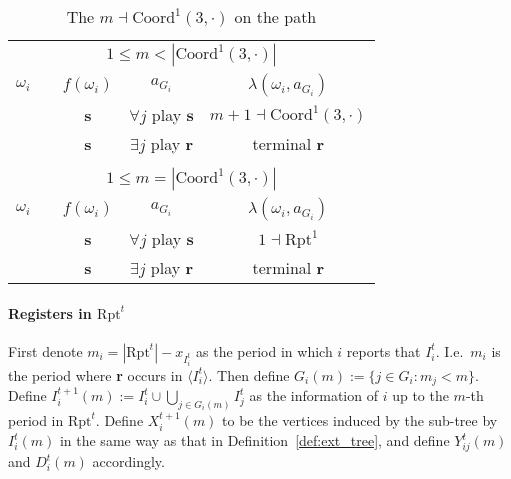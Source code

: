 \documentclass[12pt,letter]{article}
\newcommand{\Kappa}{\mathrm{Coord}}
\newcommand{\Omicron}{\mathrm{Rpt}}
\theoremstyle{definition}
\theoremstyle{remark}
\theoremstyle{claim}
\begin{document}
\begin{table}[!htbp]
\caption{The $m\dashv\Kappa^1(3,\cdot)$ on the path}
\label{table:eqm_path_k03}
\begin{center}
\begin{tabular}{c c | c | c | c}
\multicolumn{5}{c}{$1\leq m < |\Kappa^1(3,\cdot)|$}\\
$\omega_i$ 	 & 	   &	$f(\omega_i)$  &	$a_{G_i}$ & $\lambda(\omega_i,a_{G_i})$ \\
\hline
\hline
  	&	& \textbf{s} & $\forall j$ play $\textbf{s}$ 	& $m+1\dashv \Kappa^1(3,\cdot)$\\
  	&  & \textbf{s}  &  $\exists j$ play $\textbf{r}$  	& terminal \textbf{r}\\
\hline
\\
\multicolumn{5}{c}{$1\leq m = |\Kappa^1(3,\cdot)|$}\\
$\omega_i$ 	 & 	   &	$f(\omega_i)$  &	$a_{G_i}$ & $\lambda(\omega_i,a_{G_i})$ \\
\hline
\hline
  	& 	& \textbf{s} & $\forall j$ play $\textbf{s}$ 	& $1\dashv \Omicron^1$\\
  	&  & \textbf{s}  &  $\exists j$ play $\textbf{r}$  	& terminal \textbf{r}\\
\hline
\end{tabular}
\end{center}
\end{table}



\clearpage

\paragraph{Registers in $\Omicron^t$}
First denote $m_i=|\Omicron^t|-x_{I^t_i}$ as the period in which $i$ reports that $I^t_i$. I.e.~$m_i$ is the period where \textbf{r} occurs in $\langle I^t_i \rangle$. 
Then define $G_i(m):=\{j\in G_i: m_j<m\}$. Define $I^{t+1}_i(m):= I^t_i\cup\bigcup_{j\in G_i(m)}I^t_j$ as the information of $i$ up to the $m$-th period in $\Omicron^t$. 
Define $X^{t+1}_i(m)$ to be the vertices induced by the sub-tree by $I^t_i(m)$ in the same way as that in Definition~\ref{def:ext_tree}, and define $Y^t_{ij}(m)$ and $D^t_i(m)$ accordingly.
\end{document}

